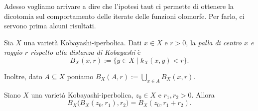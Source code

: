 Adesso vogliamo arrivare a dire che l'ipotesi taut ci permette di ottenere la dicotomia sul comportamento delle iterate delle funzioni olomorfe. Per farlo, ci servono prima alcuni risultati.

\begin{defn}
    Sia $X$ una varietà Kobayashi-iperbolica. Dati $x\in X$ e $r>0$, la \textit{palla di centro $x$ e raggio $r$ rispetto alla distanza di Kobayashi} è
    $$B_X(x,r):=\{y\in X\mid k_X(x,y)<r\}.$$

    Inoltre, dato $A\subseteq X$ poniamo $B_X(A,r):=\displaystyle\bigcup_{x\in A} B_X(x,r)$.
\end{defn}

\begin{lm} \label{ballball}
    Siano $X$ una varietà Kobayashi-iperbolica, $z_0 \in X$ e $r_1,r_2>0$. Allora
    $$B_X\big(B_X(z_0,r_1),r_2\big)=B_X(z_0,r_1+r_2).$$
\end{lm}
